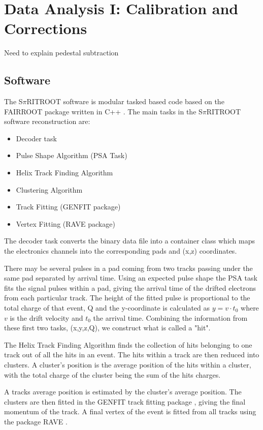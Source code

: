 \chapter{Data Analysis I: Calibration and Corrections}

Need to explain pedestal subtraction 

\section{Software}
\label{sec:software}

The S$\pi$RITROOT software is modular tasked based code based on the FAIRROOT package written in C++ \cite{fairroot}. The main tasks in the S$\pi$RITROOT software reconstruction are:
\begin{itemize}
  \item Decoder task
  \item Pulse Shape Algorithm (PSA Task)
  \item Helix Track Finding Algorithm
  \item Clustering Algorithm
  \item Track Fitting (GENFIT package)
  \item Vertex Fitting (RAVE package)
\end{itemize}

The decoder task converts the binary data file into a container class which maps the electronics channels into the corresponding pads and (x,z) coordinates. 

There may be several pulses in a pad coming from two tracks passing under the same pad separated  by arrival time. Using an expected pulse shape the PSA task fits the signal pulses within a pad, giving the arrival time of the drifted electrons from each particular track. The height of the fitted pulse is proportional to the total charge of that event, Q and the y-coordinate is calculated as $y = v\cdot t_0$ where $v$ is the drift velocity and $t_0$ the arrival time. Combining the information from these first two tasks, (x,y,z,Q), we construct what is called a "hit". 

 The Helix Track Finding Algorithm finds the collection of hits belonging to one track out of all the hits in an event. The hits within a track are then reduced into clusters. A cluster's position is the average position of the hits within a cluster, with the total charge of the cluster being the sum of the hits charges. 
 
 A tracks average position is estimated by the cluster's average position. The clusters are then fitted in the GENFIT track fitting package \cite{genfit}, giving the final momentum of the track. A final vertex of the event is fitted from all tracks using the package RAVE \cite{rave}. 

